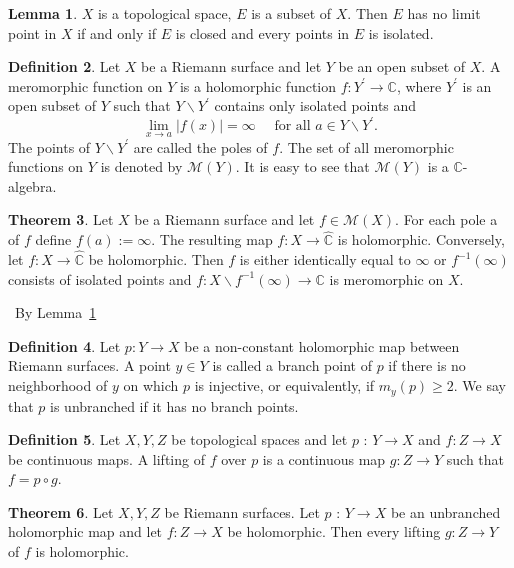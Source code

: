 \documentclass[12pt,a4paper]{book}
\newenvironment{prooff}{{\noindent\it\textcolor{cyan!40!black}{Proof}:}\,}{\par}
\theoremstyle{definition}
\newtheorem{defn}{Definition}[section]
\newtheorem{theo}[defn]{Theorem}
\newtheorem{lem}[defn]{Lemma}
\begin{document}
\begin{lem}
    $X$ is a topological space, $E$ is a subset of $X$. Then $E$ has no limit point in $X$ if and only if $E$ is closed and every points in $E$ is isolated.
    \label{lemma:no limit point iff closed and isolated}
\end{lem}
\begin{defn}
    Let $X$ be a Riemann surface and let $Y$ be an open subset of $X$. A meromorphic function on $Y$ is a holomorphic function $f: Y^{\prime} \rightarrow \mathbb{C}$, where $Y^{\prime}$ is an open subset of $Y$ such that $Y \backslash Y^{\prime}$ contains only isolated points and
    $$
        \lim _{x \rightarrow a}|f(x)|=\infty \quad \text { for all } a \in Y \backslash Y^{\prime} .
    $$
    The points of $Y \backslash Y^{\prime}$ are called the poles of $f$. The set of all meromorphic functions on $Y$ is denoted by $\mathscr{M}(Y)$. It is easy to see that $\mathscr{M}(Y)$ is a $\mathbb{C}$-algebra.
\end{defn}
\begin{theo}
    Let $X$ be a Riemann surface and let $f \in \mathscr{M}(X)$. For each pole a of $f$ define $f(a):=\infty$. The resulting map $f: X \rightarrow \widehat{\mathbb{C}}$ is holomorphic. Conversely, let $f: X \rightarrow \widehat{\mathbb{C}}$ be holomorphic. Then $f$ is either identically equal to $\infty$ or $f^{-1}(\infty)$ consists of isolated points and $f: X \backslash f^{-1}(\infty) \rightarrow \mathbb{C}$ is meromorphic on $X$.
\end{theo}
\begin{prooff}
    By Lemma~\ref{lemma:no limit point iff closed and isolated}
\end{prooff}
\begin{defn}
    Let $p: Y \rightarrow X$ be a non-constant holomorphic map between Riemann surfaces. A point $y \in Y$ is called a branch point of $p$ if there is no neighborhood of $y$ on which $p$ is injective, or equivalently, if $m_y(p) \geq 2$. We say that $p$ is unbranched if it has no branch points.
\end{defn}
\begin{defn}
    Let $X, Y, Z$ be topological spaces and let $p$ : $Y \rightarrow X$ and $f: Z \rightarrow X$ be continuous maps. A lifting of $f$ over $p$ is a continuous map $g: Z \rightarrow Y$ such that $f=p \circ g$.
\end{defn}
\begin{theo}
    Let $X, Y, Z$ be Riemann surfaces. Let $p$ : $Y \rightarrow X$ be an unbranched holomorphic map and let $f: Z \rightarrow X$ be holomorphic. Then every lifting $g: Z \rightarrow Y$ of $f$ is holomorphic.
\end{theo}
\end{document}
